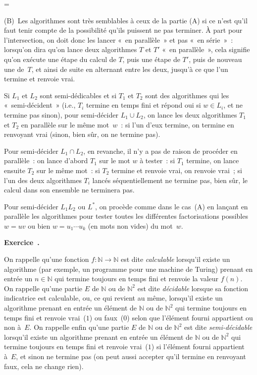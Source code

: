 \documentclass[12pt,a4paper]{article}
\theoremstyle{definition}
\newcommand\exercice{%
\refstepcounter{comcnt}\bigskip\noindent\textbf{Exercice~\thecomcnt.}}
\newif\ifcorrige
\newenvironment{corrige}%
{\ifcorrige\relax\else\setbox0=\vbox\bgroup\fi%
\smallbreak\footnotesize\noindent{\underbar{\textit{Corrigé.}}\quad}}
{{\hbox{}\nobreak\hfill\checkmark}%
\ifcorrige\relax\else\egroup\fi\par}
\begin{document}
\begin{corrige}
\smallbreak

(B) Les algorithmes sont très semblables à ceux de la partie (A) si ce
n'est qu'il faut tenir compte de la possibilité qu'ils puissent ne pas
terminer.  À part pour l'intersection, on doit donc les lancer « en
parallèle » et pas « en série » : lorsqu'on dira qu'on lance deux
algorithmes $T$ et $T'$ « en parallèle », cela signifie qu'on exécute
une étape du calcul de $T$, puis une étape de $T'$, puis de nouveau
une de $T$, et ainsi de suite en alternant entre les deux, jusqu'à ce
que l'un termine et renvoie vrai.

Si $L_1$ et $L_2$ sont semi-dédicables et si $T_1$ et $T_2$ sont des
algorithmes qui les « semi-décident » (i.e., $T_i$ termine en temps
fini et répond oui si $w\in L_i$, et ne termine pas sinon), pour
semi-décider $L_1\cup L_2$, on lance les deux algorithmes $T_1$ et
$T_2$ en parallèle sur le même mot $w$ : si l'un d'eux termine, on
termine en renvoyant vrai (sinon, bien sûr, on ne termine pas).

Pour semi-décider $L_1\cap L_2$, en revanche, il n'y a pas de raison
de procéder en parallèle : on lance d'abord $T_1$ sur le mot $w$ à
tester : si $T_1$ termine, on lance ensuite $T_2$ sur le même mot : si
$T_2$ termine et renvoie vrai, on renvoie vrai ; si l'un des deux
algorithmes $T_i$ lancés séquentiellement ne termine pas, bien sûr, le
calcul dans son ensemble ne terminera pas.

Pour semi-décider $L_1 L_2$ ou $L^*$, on procède comme dans le cas (A)
en lançant en parallèle les algorithmes pour tester toutes les
différentes factorisations possibles $w = uv$ ou bien $w = u_1\cdots
u_k$ (en mots non vides) du mot $w$.
\end{corrige}

%

\exercice

On rappelle qu'une fonction $f\colon \mathbb{N} \to \mathbb{N}$ est
dite \emph{calculable} lorsqu'il existe un algorithme (par exemple, un
programme pour une machine de Turing) prenant en entrée un
$n\in\mathbb{N}$ qui termine toujours en temps fini et renvoie la
valeur $f(n)$.  On rappelle qu'une partie $E$ de $\mathbb{N}$ ou de
$\mathbb{N}^2$ est dite \emph{décidable} lorsque sa fonction
indicatrice est calculable, ou, ce qui revient au même, lorsqu'il
existe un algorithme prenant en entrée un élément de $\mathbb{N}$ ou
de $\mathbb{N}^2$ qui termine toujours en temps fini et renvoie
vrai ($1$) ou faux ($0$) selon que l'élément fourni appartient ou non
à $E$.  On rappelle enfin qu'une partie $E$ de $\mathbb{N}$ ou de
$\mathbb{N}^2$ est dite \emph{semi-décidable} lorsqu'il existe un
algorithme prenant en entrée un élément de $\mathbb{N}$ ou de
$\mathbb{N}^2$ qui termine toujours en temps fini et renvoie
vrai ($1$) si l'élément fourni appartient à $E$, et sinon ne termine
pas (on peut aussi accepter qu'il termine en renvoyant faux, cela ne
change rien).
\end{document}
